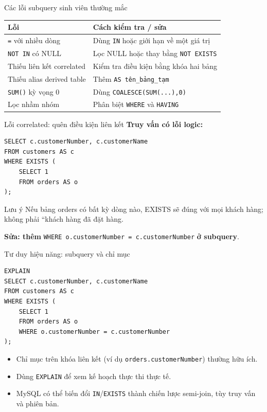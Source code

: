 \documentclass[aspectratio=169,10pt]{beamer}
\newcommand{\code}[1]{\texttt{#1}}
\begin{document}
\begin{frame}[fragile]{Các lỗi subquery sinh viên thường mắc}
\small
\begin{tabularx}{\linewidth}{l X}\toprule
Lỗi & Cách kiểm tra / sửa\\\midrule
\code{=} với nhiều dòng & Dùng \code{IN} hoặc giới hạn về một giá trị\\
\code{NOT IN} có NULL & Lọc NULL hoặc thay bằng \code{NOT EXISTS}\\
Thiếu liên kết correlated & Kiểm tra điều kiện bằng khóa hai bảng\\
Thiếu alias derived table & Thêm \code{AS tên\_bảng\_tạm}\\
\code{SUM()} kỳ vọng 0 & Dùng \code{COALESCE(SUM(...),0)}\\
Lọc nhầm nhóm & Phân biệt \code{WHERE} và \code{HAVING}\\\bottomrule
\end{tabularx}
\end{frame}

\begin{frame}[fragile]{Lỗi correlated: quên điều kiện liên kết}
\textbf{Truy vấn có lỗi logic:}\begin{lstlisting}
SELECT c.customerNumber, c.customerName
FROM customers AS c
WHERE EXISTS (
    SELECT 1
    FROM orders AS o
);
\end{lstlisting}
\begin{alertblock}{Lưu ý}
\small Nếu bảng orders có bất kỳ dòng nào, EXISTS sẽ đúng với mọi khách hàng; không phải ``khách hàng đã đặt hàng.
\end{alertblock}
\textbf{Sửa: thêm} \code{WHERE o.customerNumber = c.customerNumber} \textbf{ở subquery}.
\end{frame}

\begin{frame}[fragile]{Tư duy hiệu năng: subquery và chỉ mục}
\begin{lstlisting}
EXPLAIN
SELECT c.customerNumber, c.customerName
FROM customers AS c
WHERE EXISTS (
    SELECT 1
    FROM orders AS o
    WHERE o.customerNumber = c.customerNumber
);
\end{lstlisting}
\begin{itemize}
\item Chỉ mục trên khóa liên kết (ví dụ \code{orders.customerNumber}) thường hữu ích.
\item Dùng \code{EXPLAIN} để xem kế hoạch thực thi thực tế.
\item MySQL có thể biến đổi \code{IN}/\code{EXISTS} thành chiến lược semi-join, tùy truy vấn và phiên bản.
\end{itemize}
\end{frame}
\end{document}
